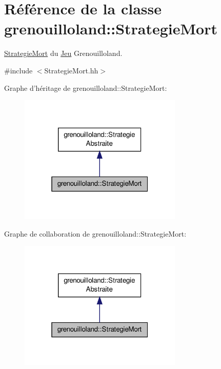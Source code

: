 \hypertarget{classgrenouilloland_1_1StrategieMort}{\section{Référence de la classe grenouilloland\-:\-:Strategie\-Mort}
\label{classgrenouilloland_1_1StrategieMort}
}


\hyperlink{classgrenouilloland_1_1StrategieMort}{Strategie\-Mort} du \hyperlink{classgrenouilloland_1_1Jeu}{Jeu} Grenouilloland.  




{\ttfamily \#include $<$Strategie\-Mort.\-hh$>$}



Graphe d'héritage de grenouilloland\-:\-:Strategie\-Mort\-:
\nopagebreak
\begin{figure}[H]
\begin{center}
\leavevmode
\includegraphics[width=220pt]{classgrenouilloland_1_1StrategieMort__inherit__graph}
\end{center}
\end{figure}


Graphe de collaboration de grenouilloland\-:\-:Strategie\-Mort\-:
\nopagebreak
\begin{figure}[H]
\begin{center}
\leavevmode
\includegraphics[width=220pt]{classgrenouilloland_1_1StrategieMort__coll__graph}
\end{center}
\end{figure}
